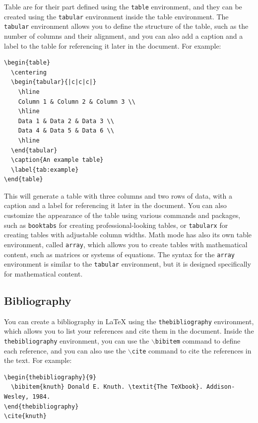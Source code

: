 Table are for their part defined using the \texttt{table} environment, and they can be created using the \texttt{tabular} environment inside the table environment. The \texttt{tabular} environment allows you to define the structure of the table, such as the number of columns and their alignment, and you can also add a caption and a label to the table for referencing it later in the document. For example:
\begin{verbatim}
\begin{table}
  \centering
  \begin{tabular}{|c|c|c|}
    \hline
    Column 1 & Column 2 & Column 3 \\
    \hline
    Data 1 & Data 2 & Data 3 \\
    Data 4 & Data 5 & Data 6 \\
    \hline
  \end{tabular}
  \caption{An example table}
  \label{tab:example}
\end{table}
\end{verbatim}
This will generate a table with three columns and two rows of data, with a caption and a label for referencing it later in the document. You can also customize the appearance of the table using various commands and packages, such as \texttt{booktabs} for creating professional-looking tables, or \texttt{tabularx} for creating tables with adjustable column widths. Math mode has also its own table environment, called \texttt{array}, which allows you to create tables with mathematical content, such as matrices or systems of equations. The syntax for the \texttt{array} environment is similar to the \texttt{tabular} environment, but it is designed specifically for mathematical content.

\subsection{Bibliography}

You can create a bibliography in LaTeX using the \texttt{thebibliography} environment, which allows you to list your references and cite them in the document. Inside the \texttt{thebibliography} environment, you can use the \texttt{\(\backslash\)bibitem} command to define each reference, and you can also use the \texttt{\(\backslash\)cite} command to cite the references in the text. For example:
\begin{verbatim}
\begin{thebibliography}{9}
  \bibitem{knuth} Donald E. Knuth. \textit{The TeXbook}. Addison-Wesley, 1984.
\end{thebibliography}
\cite{knuth}
\end{verbatim}

